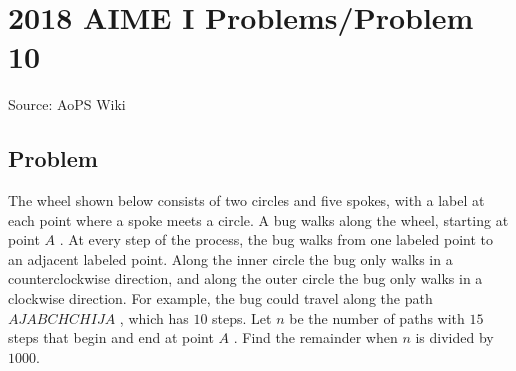 \documentclass[12pt]{article}
\begin{document}
\section*{{2018 AIME I Problems/Problem 10}}
Source: AoPS Wiki

\subsection*{Problem}
The wheel shown below consists of two circles and five spokes, with a label at each point where a spoke meets a circle. A bug walks along the wheel, starting at point $A$ . At every step of the process, the bug walks from one labeled point to an adjacent labeled point. Along the inner circle the bug only walks in a counterclockwise direction, and along the outer circle the bug only walks in a clockwise direction. For example, the bug could travel along the path $AJABCHCHIJA$ , which has $10$ steps. Let $n$ be the number of paths with $15$ steps that begin and end at point $A$ . Find the remainder when $n$ is divided by $1000.$
\end{document}
